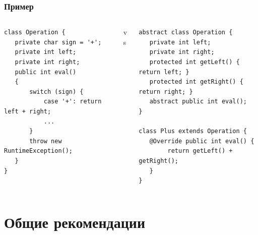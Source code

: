 \documentclass[xetex,mathserif,serif]{beamer}
\begin{document}
    \begin{frame}[fragile]
        \frametitle{Пример}
        \begin{footnotesize}
            \begin{columns}
                \begin{column}{0.35\textwidth}
                    \begin{verbatim}
class Operation {
   private char sign = '+';
   private int left;
   private int right;
   public int eval()
   {
       switch (sign) {
           case '+': return left + right;
           ...
       }
       throw new RuntimeException();
   }
}
                    \end{verbatim}
                \end{column}
                \begin{column}{0.1\textwidth}
                    vs
                \end{column}
                \begin{column}{0.45\textwidth}
                    \begin{verbatim}
abstract class Operation {
   private int left;
   private int right;
   protected int getLeft() { return left; }
   protected int getRight() { return right; }
   abstract public int eval();
}

class Plus extends Operation {
   @Override public int eval() { 
        return getLeft() + getRight(); 
   }
}
                    \end{verbatim}
                \end{column}
            \end{columns}
        \end{footnotesize}
    \end{frame}

    \section{Общие рекомендации}
\end{document}
